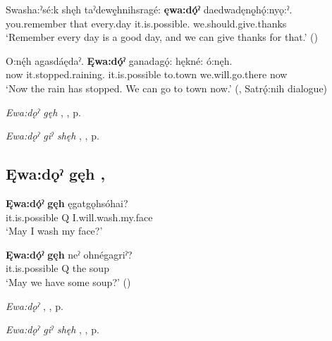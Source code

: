 \ea
\label{ex:enpart15}
\gll Swasha:ˀsé:k shęh taˀdewę̱hnihsragé: \textbf{ęwa:dǫ́ˀ} daedwadęnǫ̱hǫ́:nyǫ:ˀ.\\
you.remember that every.day it.is.possible. we.should.give.thanks\\
\glt ‘Remember every day is a good day, and we can give thanks for that.’ (\cite{carrier_legends_2013})
\z

\ea
\label{ex:enpart16}
\gll O:nę́h agasdáędaˀ. \textbf{Ęwa:dǫ́ˀ} ganadagǫ́: hękné: ó:nęh.\\
now it.stopped.raining. it.is.possible to.town we.will.go.there now\\
\glt ‘Now the rain has stopped. We can go to town now.’ (\cite[212]{mithun_watewayestanih_1984}, Satrǫ́:nih dialogue)
\z

\begin{CayugaRelated}
\item \textit{Ewa:dǫˀ gęh} , , p. \pageref{p:[ęwa:dǫˀ gęh]}\\
\item \textit{Ewa:dǫˀ giˀ shęh} , , p. \pageref{p:[ęwa:dǫˀ giˀ shęh]}
\end{CayugaRelated}

\subsection*{\textbf{Ęwa:dǫˀ gęh} , } \label{p:[ęwa:dǫˀ gęh]}

\ea
\label{ex:enpart17}
\gll \textbf{Ęwa:dǫ́ˀ} \textbf{gęh} ęgatgǫhsóhai?\\
it.is.possible Q I.will.wash.my.face\\
\glt ‘May I wash my face?’
\z

\ea
\label{ex:enpart18}
\gll \textbf{Ęwa:dǫ́ˀ} \textbf{gęh} neˀ ohnégagriˀ?\\
it.is.possible Q the soup\\
\glt ‘May we have some soup?’ (\cite{carrier_legends_2013})
\z

\begin{CayugaRelated}
\item \textit{Ewa:dǫˀ} , , p. \pageref{p:[ęwa:dǫˀ]}\\
\item \textit{Ewa:dǫˀ giˀ shęh} , , p. \pageref{p:[ęwa:dǫˀ giˀ shęh]}
\end{CayugaRelated}

